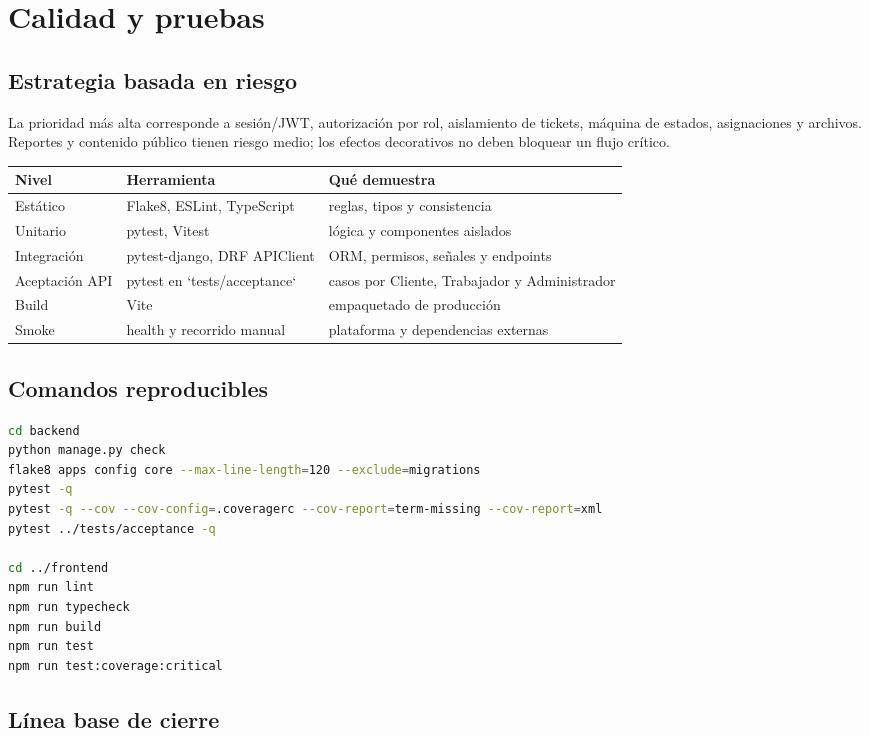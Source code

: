 \chapter{Calidad y pruebas}

\section{Estrategia basada en riesgo}

La prioridad más alta corresponde a sesión/JWT, autorización por rol, aislamiento de tickets,
máquina de estados, asignaciones y archivos. Reportes y contenido público tienen riesgo medio; los
efectos decorativos no deben bloquear un flujo crítico.

\begin{tabularx}{\textwidth}{@{}L{0.21\textwidth}L{0.22\textwidth}Y@{}}
\toprule
\textbf{Nivel} & \textbf{Herramienta} & \textbf{Qué demuestra}\\
\midrule
Estático & Flake8, ESLint, TypeScript & reglas, tipos y consistencia\\
Unitario & pytest, Vitest & lógica y componentes aislados\\
Integración & pytest-django, DRF APIClient & ORM, permisos, señales y endpoints\\
Aceptación API & pytest en `tests/acceptance` & casos por Cliente, Trabajador y Administrador\\
Build & Vite & empaquetado de producción\\
Smoke & health y recorrido manual & plataforma y dependencias externas\\
\bottomrule
\end{tabularx}

\section{Comandos reproducibles}

\begin{lstlisting}[language=bash]
cd backend
python manage.py check
flake8 apps config core --max-line-length=120 --exclude=migrations
pytest -q
pytest -q --cov --cov-config=.coveragerc --cov-report=term-missing --cov-report=xml
pytest ../tests/acceptance -q

cd ../frontend
npm run lint
npm run typecheck
npm run build
npm run test
npm run test:coverage:critical
\end{lstlisting}

\section{Línea base de cierre}

